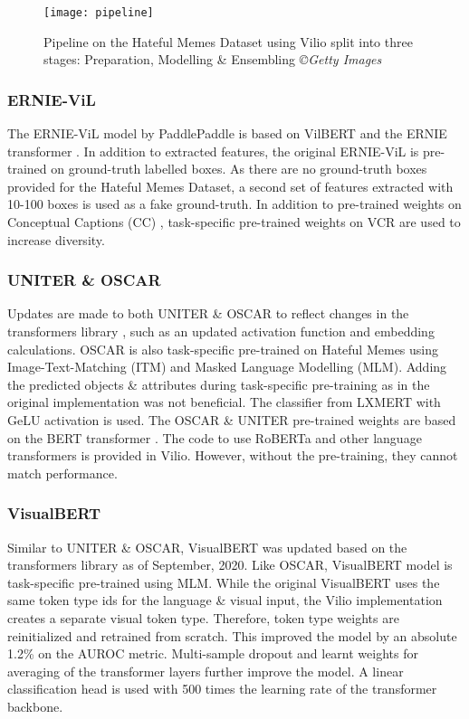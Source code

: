 \documentclass{article}
\begin{document}
\begin{figure}[t]
    \centering
    \texttt{[image: pipeline]}
    \captionsetup{justification=centering}
    \caption{Pipeline on the Hateful Memes Dataset using Vilio split into three stages: Preparation, Modelling \& Ensembling \textit{©Getty Images}}
    \label{fig:fig2}
\end{figure}


\subsubsection{ERNIE-ViL}

The ERNIE-ViL model by PaddlePaddle \cite{yu2020ernie} is based on VilBERT \cite{lu2019vilbert} and the ERNIE transformer \cite{zhang2019ernie}. In addition to extracted features, the original ERNIE-ViL is pre-trained on ground-truth labelled boxes. As there are no ground-truth boxes provided for the Hateful Memes Dataset, a second set of features extracted with 10-100 boxes is used as a fake ground-truth. In addition to pre-trained weights on Conceptual Captions (CC) \cite{sharma2018conceptual}, task-specific pre-trained weights on VCR \cite{zellers2019recognition} are used to increase diversity. 

\subsubsection{UNITER \& OSCAR}

Updates are made to both UNITER \& OSCAR to reflect changes in the transformers library \cite{wolf2019huggingface}, such as an updated activation function and embedding calculations. OSCAR is also task-specific pre-trained on Hateful Memes using Image-Text-Matching (ITM) and Masked Language Modelling (MLM). Adding the predicted objects \& attributes during task-specific pre-training as in the original implementation was not beneficial. The classifier from LXMERT with GeLU activation \cite{tan2019lxmert} is used.
The OSCAR \& UNITER pre-trained weights are based on the BERT transformer \cite{devlin2018bert}. The code to use RoBERTa \cite{liu2019roberta} and other language transformers is provided in Vilio. However, without the pre-training, they cannot match performance.

\subsubsection{VisualBERT}

Similar to UNITER \& OSCAR, VisualBERT was updated based on the transformers library as of September, 2020. Like OSCAR, VisualBERT model is task-specific pre-trained using MLM. While the original VisualBERT uses the same token type ids for the language \& visual input, the Vilio implementation creates a separate visual token type. Therefore, token type weights are reinitialized and retrained from scratch. This improved the model by an absolute 1.2\% on the AUROC metric. Multi-sample dropout \cite{inoue2019multi} and learnt weights for averaging of the transformer layers further improve the model. A linear classification head is used with 500 times the learning rate of the transformer backbone.
\end{document}
